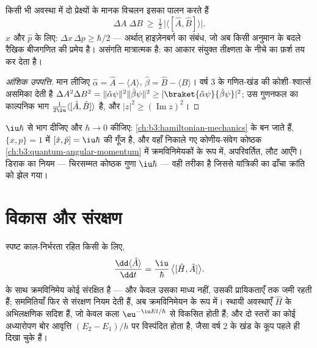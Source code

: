 \begin{theorem}[अनिश्चितता संबंध, व्यापक रूप में]\label{thm:b3:quantum-formalism:uncertainty}
किसी भी अवस्था में दो प्रेक्ष्यों के मानक विचलन इसका पालन करते हैं
\[
\Delta A\;\Delta B \ \ge\ \tfrac12\,\big|\langle[\hat A, \hat
B]\rangle\big| .
\]
$\hat x$ और $\hat p$ के लिए: $\Delta x\,\Delta p \ge \hbar/2$ ---
अर्थात् हाइज़ेनबर्ग का संबंध, जो अब किसी अनुमान के बदले रैखिक बीजगणित
की प्रमेय है। असंगति मात्रात्मक है:  का आकार
संयुक्त तीक्ष्णता के नीचे का फ़र्श तय कर देता है।
\end{theorem}

\begin{proof}[आंशिक उपपत्ति]
मान लीजिए $\hat\alpha = \hat A - \langle A\rangle$, $\hat\beta = \hat B -
\langle B\rangle$। वर्ष 3 के गणित-खंड की कोशी--श्वार्त्स असमिका
देती है $\Delta A^2\Delta B^2 =
\|\hat\alpha\psi\|^2\|\hat\beta\psi\|^2 \ge
|\braket{\hat\alpha\psi}{\hat\beta\psi}|^2$; उस गुणनफल का काल्पनिक भाग
$\tfrac1{2\iu}\langle[\hat A, \hat B]\rangle$ है, और
$|z|^2 \ge (\operatorname{Im}z)^2$।
\end{proof}

\begin{remark}[चिरसम्मत छाया]\label{rem:b3:quantum-formalism:poisson}
$\iu\hbar$ से भाग दीजिए और $\hbar \to 0$ कीजिए: 
\cref{ch:b3:hamiltonian-mechanics} के  बन जाते हैं, $\{x, p\} =
1$ में $[\hat x, \hat p] = \iu\hbar$ की गूँज है, और वहाँ निकाले गए
कोणीय-संवेग कोष्ठक \cref{ch:b3:quantum-angular-momentum} में
क्रमविनिमेयकों के रूप में, अपरिवर्तित, लौट आएँगे। डिराक का नियम ---
चिरसम्मत कोष्ठक गुणा $\iu\hbar$ --- वही तरीका है जिससे यांत्रिकी का
ढाँचा क्रांति को झेल गया।
\end{remark}

\section{विकास और संरक्षण}

\begin{proposition}[औसतों का विकास; संरक्षित राशियाँ]\label{prop:b3:quantum-formalism:evolution}
स्पष्ट काल-निर्भरता रहित किसी  के लिए,
\[
\frac{\dd\langle\hat A\rangle}{\dd t}
 = \frac{\iu}{\hbar}\,\big\langle[\hat H, \hat A]\big\rangle .
\]
 के साथ क्रमविनिमेय कोई  संरक्षित है --- और
केवल उसका माध्य नहीं, उसकी प्रायिकताएँ तक जमी रहती हैं; सममितियाँ
फिर से संरक्षण नियम देती हैं, अब क्रमविनिमेयन के रूप में। स्थायी
अवस्थाएँ $\hat H$ के अभिलक्षणिक सदिश हैं, जो केवल कला
$\eu^{-\iu Et/\hbar}$ से विकसित होती हैं; और दो स्तरों का कोई
अध्यारोपण बोर आवृत्ति $(E_2 - E_1)/h$ पर विस्पंदित होता है, जैसा
वर्ष 2 के खंड के कूप पहले ही दिखा चुके हैं।
\end{proposition}

